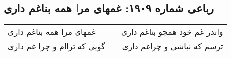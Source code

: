 \begin{center}
\section*{رباعی شماره ۱۹۰۹: غمهای مرا همه بناغم داری}
\label{sec:1909}
\begin{longtable}{l p{0.5cm} r}
غمهای مرا همه بناغم داری
&&
واندر غم خود همچو بناغم داری
\\
گویی که تراام و چرا غم داری
&&
ترسم که نباشی و چراغم داری
\\
\end{longtable}
\end{center}
